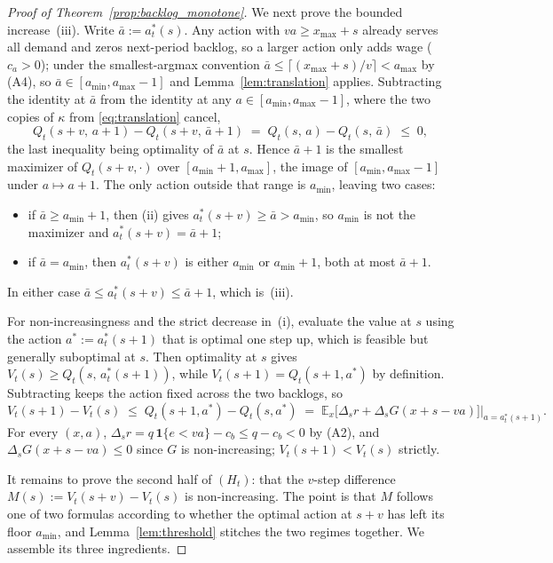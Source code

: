 \documentclass[preprint,11pt,authoryear]{elsarticle}
\theoremstyle{remark}
\begin{document}
\begin{proof}[Proof of Theorem~\ref{prop:backlog_monotone}]
We next prove the bounded increase~(iii). Write $\bar a := a^*_t(s)$. Any action with $va \ge x_{\max} + s$ already serves all demand and zeros next-period backlog, so a larger action only adds wage ($c_a > 0$); under the smallest-argmax convention $\bar a \le \lceil (x_{\max} + s)/v \rceil < a_{\max}$ by (A4), so $\bar a \in [a_{\min}, a_{\max}-1]$ and Lemma~\ref{lem:translation} applies. Subtracting the identity at $\bar a$ from the identity at any $a \in [a_{\min}, a_{\max}-1]$, where the two copies of $\kappa$ from \eqref{eq:translation} cancel,
\[
Q_t(s+v,\, a+1) - Q_t(s+v,\, \bar a + 1) \;=\; Q_t(s,\,a) - Q_t(s,\,\bar a) \;\le\; 0,
\]
the last inequality being optimality of $\bar a$ at $s$. Hence $\bar a + 1$ is the smallest maximizer of $Q_t(s+v,\cdot)$ over $[a_{\min}+1, a_{\max}]$, the image of $[a_{\min}, a_{\max}-1]$ under $a \mapsto a+1$. The only action outside that range is $a_{\min}$, leaving two cases:
\begin{itemize}
\item if $\bar a \ge a_{\min}+1$, then (ii) gives $a^*_t(s+v) \ge \bar a > a_{\min}$, so $a_{\min}$ is not the maximizer and $a^*_t(s+v) = \bar a + 1$;
\item if $\bar a = a_{\min}$, then $a^*_t(s+v)$ is either $a_{\min}$ or $a_{\min}+1$, both at most $\bar a + 1$.
\end{itemize}
In either case $\bar a \le a^*_t(s+v) \le \bar a + 1$, which is~(iii).

For non-increasingness and the strict decrease in~(i), evaluate the value at $s$ using the action $a^* := a^*_t(s+1)$ that is optimal one step up, which is feasible but generally suboptimal at $s$. Then optimality at $s$ gives $V_t(s) \ge Q_t(s,\, a^*_t(s+1))$, while $V_t(s+1) = Q_t(s+1, a^*)$ by definition. Subtracting keeps the action fixed across the two backlogs, so
\[
V_t(s+1) - V_t(s) \;\le\; Q_t(s+1, a^*) - Q_t(s, a^*) \;=\; \mathbb{E}_x\!\bigl[\Delta_s r + \Delta_s G(x+s-va)\bigr]\big|_{a = a^*_t(s+1)}.
\]
For every $(x,a)$, $\Delta_s r = q\,\mathbf{1}\{e<va\} - c_b \le q - c_b < 0$ by (A2), and $\Delta_s G(x+s-va) \le 0$ since $G$ is non-increasing; $V_t(s+1) < V_t(s)$ strictly.

It remains to prove the second half of $(H_t)$: that the $v$-step difference $M(s) := V_t(s+v) - V_t(s)$ is non-increasing. The point is that $M$ follows one of two formulas according to whether the optimal action at $s+v$ has left its floor $a_{\min}$, and Lemma~\ref{lem:threshold} stitches the two regimes together. We assemble its three ingredients.


\end{proof}
\end{document}
